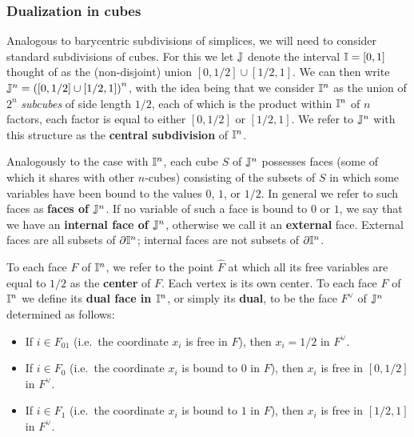 \subsubsection{Dualization in cubes}\label{S: dual cubes}

Analogous to barycentric subdivisions of simplices, we will need to consider standard subdivisions of cubes.
For this we let $\mathbb{J}$ denote the interval $\mathbb{I} = [0,1]$ thought of as the (non-disjoint) union $[0,1/2] \cup [1/2,1]$.
We can then write $\mathbb{J}^n = \left([0,1/2] \cup [1/2,1]\right)^n$, with the idea being that we consider $\mathbb{I}^n$ as the union of $2^n$ \textit{subcubes} of side length $1/2$, each of which is the product within $\mathbb{I}^n$ of $n$ factors, each factor is equal to either $[0,1/2]$ or $[1/2,1]$.
We refer to $\mathbb{J}^n$ with this structure as the \textbf{central subdivision} of $\mathbb{I}^n$.

Analogously to the case with $\mathbb{I}^n$, each cube $S$ of $\mathbb{J}^n$ possesses faces (some of which it shares with other $n$-cubes) consisting of the subsets of $S$ in which some variables have been bound to the values $0$, $1$, or $1/2$.
In general we refer to such faces as \textbf{faces of $\mathbb{J}^n$}.
If no variable of such a face is bound to $0$ or $1$, we say that we have an \textbf{internal face of $\mathbb{J}^n$}, otherwise we call it an \textbf{external} face.
External faces are all subsets of $\partial \mathbb{I}^n$; internal faces are not subsets of $\partial \mathbb{I}^n$.

To each face $F$ of $\mathbb{I}^n$, we refer to the point $\hat F$ at which all its free variables are equal to $1/2$ as the \textbf{center} of $F$.
Each vertex is its own center.
To each face $F$ of $\mathbb{I}^n$ we define its \textbf{dual face in $\mathbb{I}^n$}, or simply its \textbf{dual}, to be the face $F^\vee$ of $\mathbb{J}^n$ determined as follows:
\begin{itemize}
	\item If $i \in F_{01}$ (i.e.\ the coordinate $x_i$ is free in $F$), then $x_i = 1/2$ in $F^\vee$.

	\item If $i \in F_0$ (i.e.\ the coordinate $x_i$ is bound to $0$ in $F$), then $x_i$ is free in $[0,1/2]$ in $F^\vee$.

	\item If $i \in F_1$ (i.e.\ the coordinate $x_i$ is bound to $1$ in $F$), then $x_i$ is free in $[1/2,1]$ in $F^\vee$.
\end{itemize}

